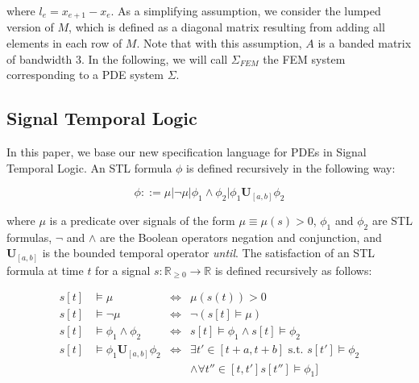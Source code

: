 \documentclass[letterpaper, 10 pt, conference]{ieeeconf/ieeeconf}
\newcommand*{\R}{\mathbb{R}}
\newcommand{\luntil}{\mathbf{U}}
\begin{document}
where $l_e = x_{e+1} - x_e$. As a simplifying assumption, we consider the lumped version of $M$, which is
defined as a diagonal matrix resulting from adding all elements in each row of
$M$. Note that with this assumption, $A$ is a banded matrix of bandwidth 3. 
In the following, we will call $\Sigma_{FEM}$ the FEM system corresponding to a
PDE system $\Sigma$.

\subsection{Signal Temporal Logic}
\label{sec:signal_temporal_logic}


In this paper, we base our new specification language for PDEs in Signal
Temporal Logic. An STL formula $\phi$ is defined recursively in the following way:

\begin{equation}
    \phi ::= \mu | \lnot \mu | \phi_1 \land \phi_2 | \phi_1 \luntil_{[a,b]} \phi_2
\end{equation}

where $\mu$ is a predicate over signals of the form $\mu \equiv \mu(s) > 0$,
$\phi_1$ and $\phi_2$ are STL formulas,
$\lnot$ and $\land$ are the Boolean operators negation and conjunction, and
$\luntil_{[a, b]}$ is the bounded temporal operator \emph{until}. The satisfaction
of an STL formula at time $t$ for a signal $s :
\R_{\geq 0} \to \R$ is defined recursively as follows:

\begin{equation}
    \begin{aligned}
        s[t] &\models \mu &\iff &\mu(s(t)) > 0 \\
        s[t] &\models \lnot \mu &\iff &\lnot (s[t] \models \mu) \\
        s[t] &\models \phi_1 \land \phi_2 &\iff &s[t] \models \phi_1 \land s[t]
        \models \phi_2 \\
        s[t] &\models \phi_1 \luntil_{[a,b]} \phi_2 &\iff 
            &\exists t' \in [t+a, t+b] \text{ s.t. } s[t'] \models \phi_2 \\
        & & &\land \forall t'' \in [t, t'] s[t''] \models \phi_1]
    \end{aligned}
\end{equation}
\end{document}
